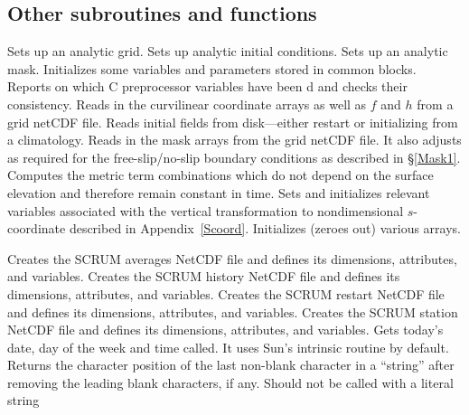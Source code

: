 \subsection{Other subroutines and functions}
\label{Minor}
\begin{klist}
   \mbox{\hspace{1in}}
   \begin{klist}
       Sets up an analytic grid.
       Sets up analytic initial conditions.
       Sets up an analytic mask.
          Initializes some variables and
   parameters stored in common blocks.
     Reports on which C preprocessor variables
   have been d and checks their consistency.
      Reads in the curvilinear coordinate arrays as
   well as $f$ and $h$ from a grid netCDF file.
      Reads initial fields from disk---either
   restart or initializing from a climatology.
      Reads in the mask arrays from
   the grid netCDF file.  It also adjusts  as required for
   the free-slip/no-slip boundary conditions as described in
   \S\ref{Mask1}.
        Computes the metric term combinations which do
   not depend on the surface elevation and therefore remain constant in
   time.
       Sets and initializes relevant variables
   associated with the vertical transformation to nondimensional
   $s$-coordinate described in Appendix~\ref{Scoord}.
      Initializes (zeroes out) various arrays.
   \end{klist}
 \mbox{\hspace{1in}}
   \begin{klist}
         Creates the SCRUM averages NetCDF file and
   defines its dimensions, attributes, and variables.
         Creates the SCRUM history NetCDF file and
   defines its dimensions, attributes, and variables.
         Creates the SCRUM restart NetCDF file and
   defines its dimensions, attributes, and variables.
      Creates the SCRUM station NetCDF file and
   defines its dimensions, attributes, and variables.
        Gets today's date, day of the week and time
   called.  It uses Sun's intrinsic  routine by default.
       Returns the character position of the last
   non-blank character in a ``string'' after removing the leading blank
   characters, if any.  Should not be called with a literal string

\end{klist}
\end{klist}
